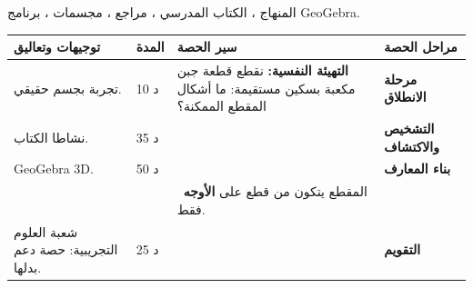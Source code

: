\documentclass[12pt,a4paper]{article}
\newenvironment{LTR}{\begin{otherlanguage}{english}}{\end{otherlanguage}}
\newcommand{\ar}[1]{\foreignlanguage{arabic}{#1}}
\newcommand{\Phase}[1]{\textbf{#1}}
\newenvironment{Sayr}{%
\begin{LTR}\renewcommand{\arraystretch}{1.25}
\begin{longtable}{|p{0.17\textwidth}|>{\centering\arraybackslash}p{0.06\textwidth}|p{0.53\textwidth}|>{\centering\arraybackslash}p{0.12\textwidth}|}
\hline\rowcolor{cThm!12}\ar{\textbf{توجيهات وتعاليق}} & \ar{\textbf{المدة}} & \ar{\textbf{سير الحصة}} & \ar{\textbf{مراحل الحصة}}\\\hline\endhead
\hline\endfoot}{\end{longtable}\end{LTR}}
\newcommand{\Row}[4]{\ar{\small #4} & \ar{#3} & \ar{#2} & \cellcolor{cThm!8}\ar{\Phase{#1}}\\\hline}
\newcommand{\Lab}[2]{\foreignlanguage{english}{\tcbox[on line,colback=#1,colframe=#1,boxrule=0pt,arc=2pt,boxsep=1pt,left=5pt,right=5pt,top=1pt,bottom=1pt]{\ar{\textcolor{white}{\textbf{#2}}}}}}
\newcommand{\ck}{\ensuremath{{\color{cRem}\checkmark}}}
\begin{document}
{المنهاج ، الكتاب المدرسي ، مراجع ، مجسمات ، برنامج GeoGebra.}
\begin{Sayr}
\Row{مرحلة الانطلاق}{%
\textbf{التهيئة النفسية:} نقطع قطعة جبن مكعبة بسكين مستقيمة: ما أشكال المقطع الممكنة؟}{10 د}{تجربة بجسم حقيقي.}
\Row{التشخيص والاكتشاف}{%
\Lab{cEx}{مناقشة النشاطين 01 و 02 صفحة 270}\par\ck\ تقاطع مستو مع أوجه المكعب: قطع مستقيمة نصلها.\par
\ck\ تقاطع مستو مع رباعي وجوه: مستقيم تقاطع مستويين.\par
}{35 د}{نشاطا الكتاب.}
\Row{بناء المعارف}{%
\Lab{cMeth}{طريقة}\par\ck\ نبحث عن نقطتين مشتركتين بين المستوي ووجه: نصلهما.\par
\ck\ إذا قطع المستوي وجهين متوازيين فالقطعتان متوازيتان.\par
\ck\ نمدد الأحرف لإيجاد نقط تقاطع مساعدة إذا لزم.\par
\Lab{cEx}{مقطع مكعب بمستو يمر بمنتصفات ثلاثة أحرف}\par\smallskip\begin{LTR}\centering \begin{tikzpicture}[scale=1.1,font=\scriptsize]
\coordinate (A) at (0,0); \coordinate (B) at (2,0); \coordinate (C) at (2.8,0.7); \coordinate (D) at (0.8,0.7);
\coordinate (E) at (0,2); \coordinate (F) at (2,2); \coordinate (G) at (2.8,2.7); \coordinate (H) at (0.8,2.7);
\coordinate (I) at (1,0); \coordinate (J) at (2.4,0.35); \coordinate (K) at (2.8,1.7);
\draw[thick] (A)--(B)--(C)--(G)--(H)--(E)--cycle (B)--(F)--(E) (F)--(G);
\draw[dashed] (A)--(D)--(C) (D)--(H);
\fill[cDef!30,opacity=0.6] (I)--(J)--(K)--(1.8,2.7)--(0.4,2.35)--(0,1.0)--cycle;
\draw[cThm,thick] (I)--(J)--(K)--(1.8,2.7)--(0.4,2.35)--(0,1.0)--cycle;
\foreach \p/\q in {A/below left,B/below right,C/right,D/above left,E/left,F/below right,G/above right,H/above left} \node[\q] at (\p){$\p$};
\end{tikzpicture}\end{LTR}\par المقطع سداسي منتظم.\par}{50 د}{GeoGebra 3D.}
\Row{}{%
\Lab{cThm!80!black}{حذار}\ المقطع يتكون من قطع على \textbf{الأوجه} فقط.}{}{}
\Row{التقويم}{%
\Lab{cEx}{تطبيق}\par $ABCD$ رباعي وجوه ، $I$ و $J$ منتصفا $[AB]$ و $[AC]$ ، $K$ نقطة من $[AD]$. أنشئ مقطع رباعي الوجوه بالمستوي $(IJK)$.\par\textbf{الحل:} المقطع هو المثلث $IJK$ (القطع $[IJ]$ ، $[JK]$ ، $[KI]$ على الأوجه $ABC$ ، $ACD$ ، $ABD$).\par\textbf{واجب منزلي:} تمارين من باب المقاطع المستوية.\par\smallskip\textbf{ملاحظات حول سير الحصة:} \dotfill}{25 د}{شعبة العلوم التجريبية: حصة دعم بدلها.}
\end{Sayr}
\end{document}
